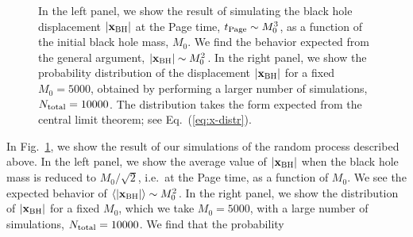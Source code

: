 \documentclass[12pt]{article}
\begin{document}
%
\begin{figure}[t]
\begin{center}
\hspace{1mm}
\caption{In the left panel, we show the result of simulating the black 
 hole displacement $|{\bf x}_{\rm BH}|$ at the Page time, $t_{\rm Page} 
 \sim M_0^3$, as a function of the initial black hole mass, $M_0$.  We 
 find the behavior expected from the general argument, $|{\bf x}_{\rm BH}| 
 \sim M_0^2$.  In the right panel, we show the probability distribution 
 of the displacement $|{\bf x}_{\rm BH}|$ for a fixed $M_0 = 5000$, obtained 
 by performing a larger number of simulations, $N_{\rm total} = 10000$. 
 The distribution takes the form expected from the central limit theorem; 
 see Eq.~(\ref{eq:x-distr}).}
\label{fig:BH-drift}
\end{center}
\end{figure}
%
In Fig.~\ref{fig:BH-drift}, we show the result of our simulations of 
the random process described above.  In the left panel, we show the 
average value of $|{\bf x}_{\rm BH}|$ when the black hole mass is reduced 
to $M_0/\sqrt{2}$, i.e.\ at the Page time, as a function of $M_0$.  We 
see the expected behavior of $\langle |{\bf x}_{\rm BH}| \rangle \sim 
M_0^2$.  In the right panel, we show the distribution of $|{\bf x}_{\rm BH}|$ 
for a fixed $M_0$, which we take $M_0 = 5000$, with a large number of 
simulations, $N_{\rm total} = 10000$.  We find that the probability 
\end{document}
